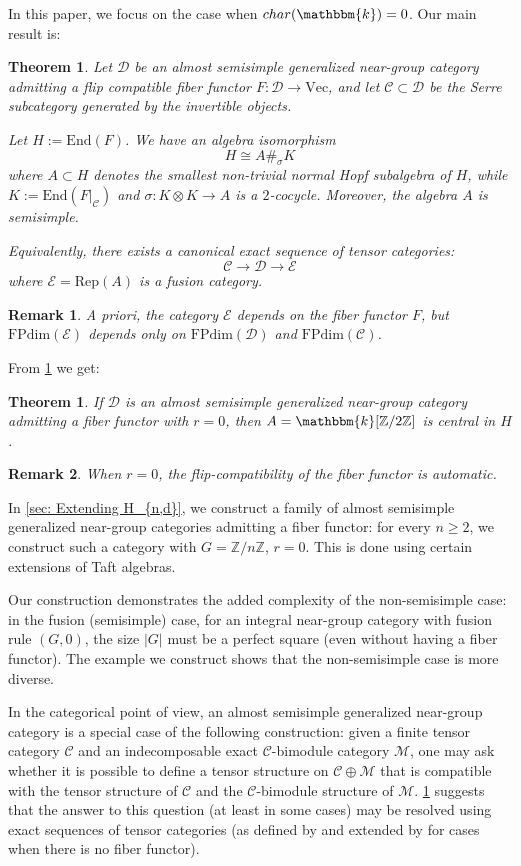 \documentclass{amsart}
\theoremstyle{plain}%
\newtheorem{introthm}[introtheorem]{Theorem}
\newtheorem*{introremark*}{Remark}
\theoremstyle{remark}
\newcommand{\C}{\mathcal{C}}
\newcommand{\1}{\mathbbm{1}}
\newcommand{\D}{\mathcal{D}}
\newcommand{\E}{\mathcal{E}}
\newcommand{\M}{\mathcal{M}}
\newcommand{\Z}{\mathbb{Z}}
\newcommand{\End}{\mathrm{End}}
\newcommand{\FPdim}{\mathrm{FPdim}}
\newcommand{\Rep}{\mathrm{Rep}}
\newcommand{\Vect}{\mathrm{Vec}}
\newcommand{\kk}{\mathbbm{k}}
\begin{document}
    In this paper, we focus on the case when $char(\kk) = 0$. Our main result is:
    \begin{introthm}\label{main theorem}
        Let $\D$ be an almost semisimple generalized near-group category admitting a flip compatible fiber functor $F:\D\to \Vect$, and let $\C\subset \D$ be the Serre subcategory generated by the invertible objects.

        Let $H:=\End(F)$. We have an algebra isomorphism $$H \cong A\#_\sigma K$$ where $A\subset H$ denotes the smallest non-trivial normal Hopf subalgebra of $H$, while $K := \End(F|_{\C})$ and $\sigma:K\otimes K\to A$ is a $2$-cocycle. Moreover, the algebra $A$ is semisimple.

        Equivalently, there exists a canonical exact sequence of tensor categories:
        $$
            \C\to \D\to \E
        $$
        where
        $\E=\Rep(A)$ is a fusion category.
    \end{introthm}
    \begin{introremark*}
        A priori, the category $\E$ depends on the fiber functor $F$, but $\FPdim(\E)$ depends only on $\FPdim(\D)$ and $\FPdim(\C)$.    
    \end{introremark*}
    
    From \cref{main theorem} we get:
    \begin{introthm}        
        If $\D$ is an almost semisimple generalized near-group category admitting a fiber functor with $r=0$, then $A = \kk[\Z/2\Z]$ is central in $H$.
    \end{introthm}
    \begin{introremark*}
        When $r=0$, the flip-compatibility of the fiber functor is automatic.
    \end{introremark*}
    In \cref{sec: Extending H_{n,d}}, we construct a family of almost semisimple generalized near-group categories admitting a fiber functor: for every $n\geq 2$, we construct such a category with $G=\Z/n\Z$, $r=0$. This is done using certain extensions of Taft algebras. 
    
    Our construction demonstrates the added complexity of the non-semisimple case: in the fusion (semisimple) case, for an integral near-group category with fusion rule $(G,0)$, the size $|G|$ must be a perfect square (even without having a fiber functor). The example we construct shows that the non-semisimple case is more diverse.

    In the categorical point of view, an almost semisimple generalized near-group category is a special case of the following construction: given a finite tensor category $\C$ and an indecomposable exact $\C$-bimodule category $\M$, one may ask whether it is possible to define a tensor structure on $\C\oplus \M$ that is compatible with the tensor structure of $\C$ and the $\C$-bimodule structure of $\M$. \cref{main theorem} suggests that the answer to this question (at least in some cases) may be resolved using exact sequences of tensor categories (as defined by \cite{BN} and extended by \cite{EG1} for cases when there is no fiber functor).
\end{document}
